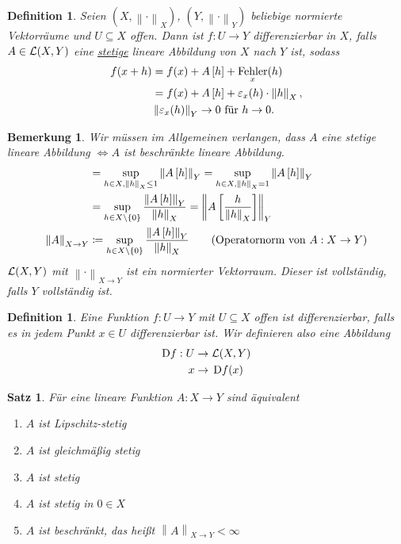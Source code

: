 \documentclass[11pt, twoside, a4paper]{article}
\theoremstyle{plain}
\newtheorem{bemerkung}[blockelement]{Bemerkung}
\newtheorem{definition}[blockelement]{Definition}
\newtheorem{satz}[blockelement]{Satz}
\numberwithin{equation}{subsection}
\newcommand{\set}[1]{\left\{#1\right\}}
\newcommand{\pair}[1]{\left(#1\right)}
\newcommand{\of}[1]{\mathopen{}\mathclose{}\bgroup\left(#1\aftergroup\egroup\right)}
\newcommand{\norm}[1]{\left\lVert#1\right\rVert}
\newcommand{\interv}[1]{\left[#1\right]}
\newcommand{\equivalent}[0]{\Leftrightarrow{}}
\newcommand{\fromto}{\rightarrow{}}
\newcommand{\exclude}[0]{\setminus}
\DeclareMathOperator{\fehler}{Fehler}
\DeclareMathOperator{\D}{D\!}
\newcommand{\mL}{\mathcal{L}}
\begin{document}
    \begin{definition}
        Seien $\pair{X, \norm{\cdot}_X}$, $\pair{Y, \norm{\cdot}_Y}$ beliebige normierte Vektorräume und $U\subseteq X$ offen. Dann ist $f: U\fromto Y$ differenzierbar in $X$, falls $A\in\mL\of{X, Y}$ eine \underline{stetige} lineare Abbildung von $X$ nach $Y$ ist, sodass
        \begin{align*}
            f\of{x+h} &= f\of{x} + A\interv{h} + \fehler_x\of{h}\\
            &= f\of{x} + A\interv{h} + \varepsilon_x\of{h}\cdot\norm{h}_X,\\
            &\norm{\varepsilon_x\of{h}}_Y \fromto 0 \text{ für } h\fromto 0.
        \end{align*}
    \end{definition}

    \begin{bemerkung}
        Wir müssen im Allgemeinen verlangen, dass $A$ eine stetige lineare Abbildung $\equivalent A$ ist beschränkte lineare Abbildung.
        \begin{align*}
            &= \sup_{h\in X, \norm{h}_X \leq 1} \norm{A\interv{h}}_Y = \sup_{h\in X, \norm{h}_X = 1} \norm{A\interv{h}}_Y\\
            &= \sup_{h\in X\exclude\set{0}} \frac{\norm{A\interv{h}}_Y}{\norm{h}_X} = \norm{A\interv{\frac{h}{\norm{h}_X}}}_Y\\
            \norm{A}_{X\fromto Y} &\coloneqq \sup_{h\in X\exclude\set{0}} \frac{\norm{A\interv{h}}_Y}{\norm{h}_X}\tag{Operatornorm von $A: X\fromto Y$}
        \end{align*}
        $\mL\of{X,Y}$ mit $\norm{\cdot}_{X\fromto Y}$ ist ein normierter Vektorraum. Dieser ist vollständig, falls $Y$ vollständig ist.
    \end{bemerkung}

    \begin{definition}
        Eine Funktion $f: U\fromto Y$ mit $U\subseteq X$ offen ist differenzierbar, falls es in jedem Punkt $x\in U$ differenzierbar ist. Wir definieren also eine Abbildung
        \begin{align*}
            \D f: U&\fromto\mL\of{X, Y}\\
            x&\fromto\D f\of{x}
        \end{align*}
    \end{definition}

    \begin{satz}
        Für eine lineare Funktion $A: X\fromto Y$ sind äquivalent
        \begin{enumerate}[label=(\roman*)]
            \item $A$ ist Lipschitz-stetig
            \item $A$ ist gleichmäßig stetig
            \item $A$ ist stetig
            \item $A$ ist stetig in $0\in X$
            \item $A$ ist beschränkt, das heißt $\norm{A}_{X\fromto Y} < \infty$
        \end{enumerate}
    \end{satz}
\end{document}
